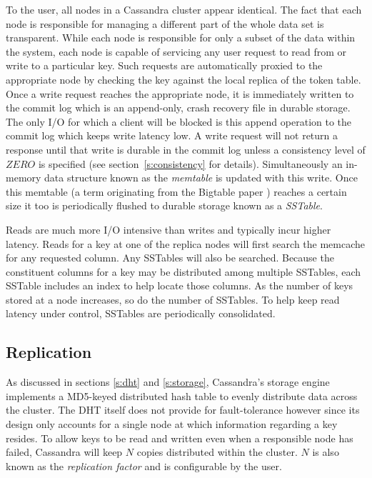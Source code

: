 \documentclass[twocolumn]{article}
\begin{document}
To the user, all nodes in a Cassandra cluster appear identical. The fact that each node is responsible for managing a different part of the whole data set is transparent. While each node is responsible for only a subset of the data within the system, each node is  capable of servicing any user request to read from or write to a particular key.  Such requests are automatically proxied to the appropriate node by checking the key against the local replica of the token table.  Once a write request reaches the appropriate node, it is immediately written to the commit log which is an append-only, crash recovery file in durable storage.  The only I/O for which a client will be blocked is this append operation to the commit log which keeps write latency low.  A write request will not return a response until that write is durable in the commit log unless a consistency level of $ZERO$ is specified (see section~\ref{s:consistency} for details).  Simultaneously an in-memory data structure known as the \emph{memtable} is updated with this write.  Once this memtable (a term originating from the Bigtable paper \cite{ref:bigtable}) reaches a certain size it too is periodically flushed to durable storage known as a \emph{SSTable}.

Reads are much more I/O intensive than writes and typically incur higher latency.  Reads for a key at one of the replica nodes will first search the memcache for any requested column.  Any SSTables will also be searched.  Because the constituent columns for a key may be distributed among multiple SSTables, each SSTable includes an index to help locate those columns. As the number of keys stored at a node increases, so do the number of SSTables.  To help keep read latency under control, SSTables are periodically consolidated.

\subsection{Replication}\label{s:replication}

As discussed in sections \ref{s:dht} and \ref{s:storage}, Cassandra's storage engine implements a MD5-keyed distributed hash table to evenly distribute data across the cluster.  The DHT itself does not provide for fault-tolerance however since its design only accounts for a single node at which information regarding a key resides.  To allow keys to be read and written even when a responsible node has failed, Cassandra will keep $N$ copies distributed within the cluster.  $N$ is also known as the \emph{replication factor} and is configurable by the user.
\end{document}
